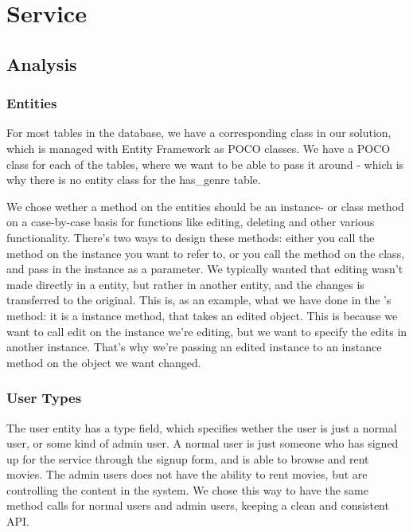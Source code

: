 \section{Service}
\label{Design_Service}

\subsection{Analysis}
\label{Design_Service_Analysis}

\subsubsection{Entities}
\label{Design_Service_Analysis_Entities}
For most tables in the database, we have a corresponding class in our solution, which is managed with Entity Framework as POCO classes. We have a POCO class for each of the tables, where we want to be able to pass it around - which is why there is no entity class for the has\_genre table.

We chose wether a method on the entities should be an instance- or class method on a case-by-case basis for functions like editing, deleting and other various functionality. There's two ways to design these methods: either you call the method on the instance you want to refer to, or you call the method on the class, and pass in the instance as a parameter. We typically wanted that editing wasn't made directly in a entity, but rather in another entity, and the changes is transferred to the original. This is, as an example, what we have done in the 's  method: it is a instance method, that takes an edited object. This is because we want to call edit on the instance we're editing, but we want to specify the edits in another instance. That's why we're passing an edited instance to an instance method on the object we want changed.

\subsubsection{User Types}
\label{Design_Service_Analysis_UserTypes}
The user entity has a type field, which specifies wether the user is just a normal user, or some kind of admin user. A normal user is just someone who has signed up for the service through the signup form, and is able to browse and rent movies. The admin users does not have the ability to rent movies, but are controlling the content in the system. We chose this way to have the same method calls for normal users and admin users, keeping a clean and consistent API. 

